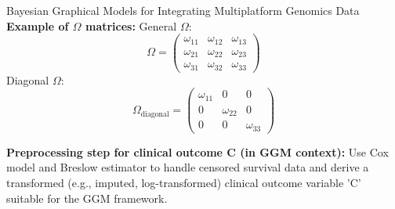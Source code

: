 \documentclass[twocolumn]{article}
\begin{document}
\begin{literaturepaper}{Bayesian Graphical Models for Integrating Multiplatform Genomics Data \cite{Wang_Baladandayuthapani_Holmes_Do_2013}}
    \textbf{Example of $\Omega$ matrices:}
    General $\Omega$:
    \[ \Omega = \begin{pmatrix} \omega_{11} & \omega_{12} & \omega_{13} \\ \omega_{21} & \omega_{22} & \omega_{23} \\ \omega_{31} & \omega_{32} & \omega_{33} \end{pmatrix} \]
    Diagonal $\Omega$:
    \[ \Omega_{\text{diagonal}} = \begin{pmatrix} \omega_{11} & 0 & 0 \\ 0 & \omega_{22} & 0 \\ 0 & 0 & \omega_{33} \end{pmatrix} \]

    \textbf{Preprocessing step for clinical outcome C (in GGM context):} Use Cox model and Breslow estimator to handle censored survival data and derive a transformed (e.g., imputed, log-transformed) clinical outcome variable 'C' suitable for the GGM framework.
\end{literaturepaper} %
\end{document}
